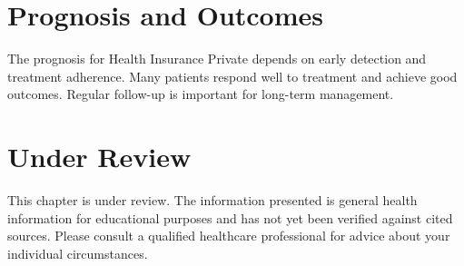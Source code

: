\section*{Prognosis and Outcomes}
The prognosis for Health Insurance Private depends on early detection and treatment adherence. Many patients respond well to treatment and achieve good outcomes. Regular follow-up is important for long-term management.
\section*{Under Review}
This chapter is under review. The information presented is general health information for educational purposes and has not yet been verified against cited sources. Please consult a qualified healthcare professional for advice about your individual circumstances.


\clearpage
